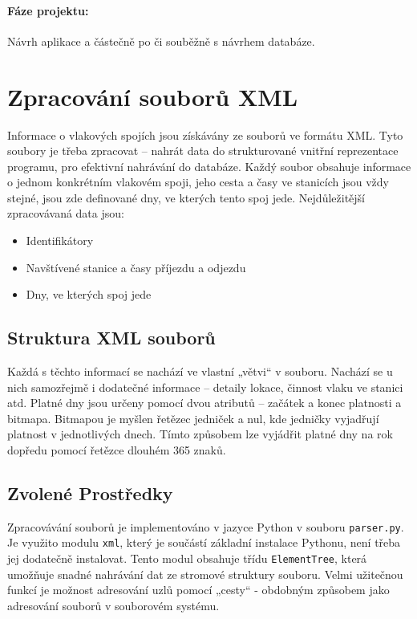\documentclass[10pt,xcolor=pdflatex,dvipsnames,table,oneside]{book}
\begin{document}
\paragraph{Fáze projektu:}
Návrh aplikace a částečně po či souběžně s návrhem databáze.
\fi
\section{Zpracování souborů XML}

Informace o vlakových spojích jsou získávány ze souborů ve formátu XML. Tyto soubory je třeba zpracovat – nahrát data do strukturované vnitřní reprezentace programu, pro efektivní nahrávání do databáze. Každý soubor obsahuje informace o jednom konkrétním vlakovém spoji, jeho cesta a časy ve stanicích jsou vždy stejné, jsou zde definované dny, ve kterých tento spoj jede. Nejdůležitější zpracovávaná data jsou:

\begin{itemize}
    \item Identifikátory
    \item Navštívené stanice a časy příjezdu a odjezdu
    \item Dny, ve kterých spoj jede
\end{itemize}

\subsection{Struktura XML souborů}
Každá s těchto informací se nachází ve vlastní „větvi“ v souboru. Nachází se u nich samozřejmě i dodatečné informace – detaily lokace, činnost vlaku ve stanici atd. Platné dny jsou určeny pomocí dvou atributů – začátek a konec platnosti a bitmapa. Bitmapou je myšlen řetězec jedniček a nul, kde jedničky vyjadřují platnost v jednotlivých dnech. Tímto způsobem lze vyjádřit platné dny na rok dopředu pomocí řetězce dlouhém 365 znaků.

\subsection{Zvolené Prostředky}
Zpracovávání souborů je implementováno v jazyce Python v souboru \verb|parser.py|. Je využito modulu \verb|xml|, který je součástí základní instalace Pythonu, není třeba jej dodatečně instalovat. Tento modul obsahuje třídu \verb|ElementTree|, která umožňuje snadné nahrávání dat ze stromové struktury souboru. Velmi užitečnou funkcí je možnost adresování uzlů pomocí „cesty“ - obdobným způsobem jako adresování souborů v souborovém systému.
\end{document}
